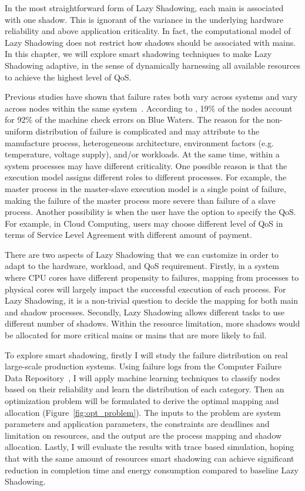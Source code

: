 In the most straightforward form of Lazy Shadowing, each main is associated with one shadow. This is ignorant of the variance in the underlying hardware reliability and above application criticality. In fact, the computational model of Lazy Shadowing does not restrict how shadows should be associated with mains. In this chapter, we will explore smart shadowing techniques to make Lazy Shadowing adaptive, in the sense of dynamically harnessing all available resources to achieve the highest level of QoS. 

Previous studies have shown that failure rates both vary across systems and vary across nodes within the same system~\cite{schroeder2007,di2014lessons}. According to \cite{di2014lessons}, 19\% of the nodes account for 92\% of the machine check errors on Blue Waters. The reason for the non-uniform distribution of failure is complicated and may attribute to the manufacture process, heterogeneous architecture, environment factors (e.g. temperature, voltage supply), and/or workloads. At the same time, within a system processes may have different criticality. One possible reason is that the execution model assigns different roles to different processes. For example, the master process in the master-slave execution model is a single point of failure, making the failure of the master process more severe than failure of a slave process. Another possibility is when the user have the option to specify the QoS. For example, in Cloud Computing, users may choose different level of QoS in terms of Service Level Agreement with different amount of payment. 

There are two aspects of Lazy Shadowing that we can customize in order to adapt to the hardware, workload, and QoS requirement. Firstly, in a system where CPU cores have different propensity to failures, mapping from processes to physical cores will largely impact the successful execution of each process. For Lazy Shadowing, it is a non-trivial question to decide the mapping for both main and shadow processes. Secondly, Lazy Shadowing allows different tasks to use different number of shadows. Within the resource limitation, more shadows would be allocated for more critical mains or mains that are more likely to fail. 

To explore smart shadowing, firstly I will study the failure distribution on real large-scale production systems. Using failure logs from the Computer Failure Data Repository~\cite{cfdr}, I will apply machine learning techniques to classify nodes based on their reliability and learn the distribution of each category. Then an optimization problem will be formulated to derive the optimal mapping and allocation (Figure~\ref{fig:opt_problem}). The inputs to the problem are system parameters and application parameters, the constraints are deadlines and limitation on resources, and the output are the process mapping and shadow allocation. Lastly, I will evaluate the results with trace based simulation, hoping that with the same amount of resources smart shadowing can achieve significant reduction in completion time and energy consumption compared to baseline Lazy Shadowing.

